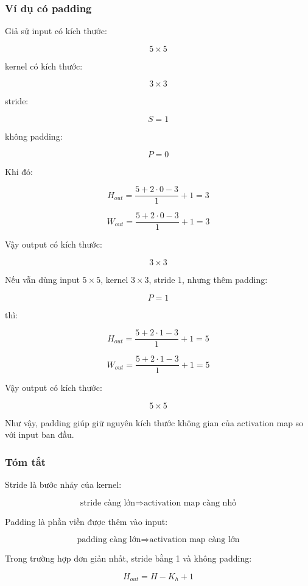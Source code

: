 \subsubsection{Ví dụ có padding}

Giả sử input có kích thước:

\[
    5 \times 5
\]

kernel có kích thước:

\[
    3 \times 3
\]

stride:

\[
    S=1
\]

không padding:

\[
    P=0
\]

Khi đó:

\[
    H_{out}
    =
    \frac{5+2\cdot0-3}{1}+1
    =
    3
\]

\[
    W_{out}
    =
    \frac{5+2\cdot0-3}{1}+1
    =
    3
\]

Vậy output có kích thước:

\[
    3 \times 3
\]

Nếu vẫn dùng input $5 \times 5$, kernel $3 \times 3$, stride $1$, nhưng thêm padding:

\[
    P=1
\]

thì:

\[
    H_{out}
    =
    \frac{5+2\cdot1-3}{1}+1
    =
    5
\]

\[
    W_{out}
    =
    \frac{5+2\cdot1-3}{1}+1
    =
    5
\]

Vậy output có kích thước:

\[
    5 \times 5
\]

Như vậy, padding giúp giữ nguyên kích thước không gian của activation map so với input ban đầu.

\subsubsection{Tóm tắt}

Stride là bước nhảy của kernel:

\[
    \text{stride càng lớn}
    \Rightarrow
    \text{activation map càng nhỏ}
\]

Padding là phần viền được thêm vào input:

\[
    \text{padding càng lớn}
    \Rightarrow
    \text{activation map càng lớn}
\]

Trong trường hợp đơn giản nhất, stride bằng 1 và không padding:

\[
    H_{out}=H-K_h+1
\]

